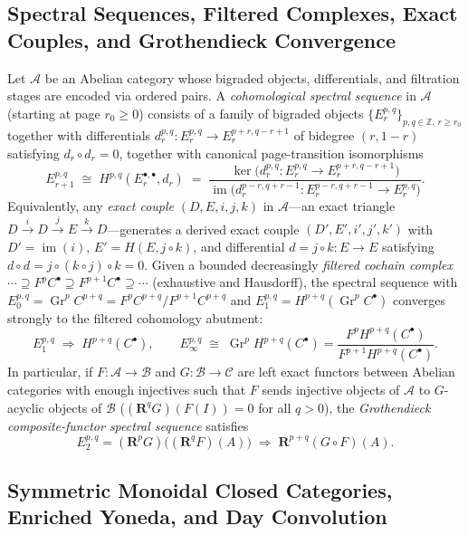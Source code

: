 \subsection{Spectral Sequences, Filtered Complexes, Exact Couples, and Grothendieck Convergence}
\label{subsec:spectral_sequences_filtered_complexes_grothendieck}

Let $\mathcal{A}$ be an Abelian category whose bigraded objects, differentials, and filtration stages are encoded via ordered pairs. A \emph{cohomological spectral sequence} in $\mathcal{A}$ (starting at page $r_0 \ge 0$) consists of a family of bigraded objects $\{E_r^{p,q}\}_{p,q \in \mathbb{Z},\, r \ge r_0}$ together with differentials $d_r^{p,q}\colon E_r^{p,q} \to E_r^{p+r, q-r+1}$ of bidegree $(r, 1-r)$ satisfying $d_r \circ d_r = 0$, together with canonical page-transition isomorphisms
\[
E_{r+1}^{p,q} \;\cong\; H^{p,q}(E_r^{\bullet,\bullet}, d_r) \;=\; \frac{\ker\bigl(d_r^{p,q}\colon E_r^{p,q} \to E_r^{p+r, q-r+1}\bigr)}{\operatorname{im}\bigl(d_r^{p-r, q+r-1}\colon E_r^{p-r, q+r-1} \to E_r^{p,q}\bigr)}.
\]
Equivalently, any \emph{exact couple} $(D, E, i, j, k)$ in $\mathcal{A}$---an exact triangle $D \xrightarrow{i} D \xrightarrow{j} E \xrightarrow{k} D$---generates a derived exact couple $(D', E', i', j', k')$ with $D' = \operatorname{im}(i)$, $E' = H(E, j \circ k)$, and differential $d = j \circ k\colon E \to E$ satisfying $d \circ d = j \circ (k \circ j) \circ k = 0$. Given a bounded decreasingly \emph{filtered cochain complex} $\cdots \supseteq F^p C^\bullet \supseteq F^{p+1} C^\bullet \supseteq \cdots$ (exhaustive and Hausdorff), the spectral sequence with $E_0^{p,q} = \operatorname{Gr}^p C^{p+q} = F^p C^{p+q}/F^{p+1} C^{p+q}$ and $E_1^{p,q} = H^{p+q}(\operatorname{Gr}^p C^\bullet)$ converges strongly to the filtered cohomology abutment:
\[
E_1^{p,q} \;\Longrightarrow\; H^{p+q}(C^\bullet), \qquad E_\infty^{p,q} \;\cong\; \operatorname{Gr}^p H^{p+q}(C^\bullet) = \frac{F^p H^{p+q}(C^\bullet)}{F^{p+1} H^{p+q}(C^\bullet)}.
\]
In particular, if $F\colon \mathcal{A} \to \mathcal{B}$ and $G\colon \mathcal{B} \to \mathcal{C}$ are left exact functors between Abelian categories with enough injectives such that $F$ sends injective objects of $\mathcal{A}$ to $G$-acyclic objects of $\mathcal{B}$ ($(\mathbf{R}^q G)(F(I)) = 0$ for all $q > 0$), the \emph{Grothendieck composite-functor spectral sequence} satisfies
\[
E_2^{p,q} = (\mathbf{R}^p G)\bigl((\mathbf{R}^q F)(A)\bigr) \;\Longrightarrow\; \mathbf{R}^{p+q}(G \circ F)(A).
\]

\subsection{Symmetric Monoidal Closed Categories, Enriched Yoneda, and Day Convolution}
\label{subsec:symmetric_monoidal_closed_enriched_yoneda_day_convolution}

